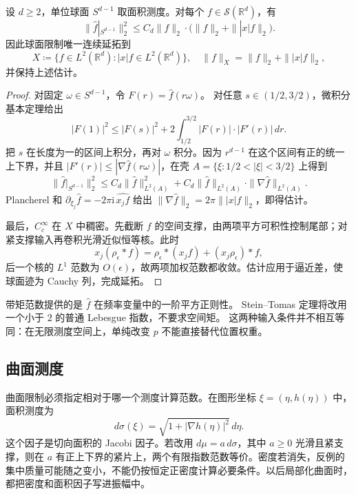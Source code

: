 \begin{proposition}[带空间矩的平方迹]\label{b2:prop:23-moment-trace}
设 \(d\geq2\)，单位球面 \(S^{d-1}\) 取面积测度。对每个
\(f\in\mathcal S(\mathbb R^d)\)，有
\[
 \|\widehat f|_{S^{d-1}}\|_2^2
 \leq C_d\|f\|_2\cdot
       \bigl(\|f\|_2+\||x|f\|_2\bigr).
\]
因此球面限制唯一连续延拓到
\[
 X\coloneqq\{f\in L^2(\mathbb R^d):|x|f\in L^2(\mathbb R^d)\},
 \quad \|f\|_X=\|f\|_2+\||x|f\|_2,
\]
并保持上述估计。
\end{proposition}
\begin{proof}
对固定 \(\omega\in S^{d-1}\)，令 \(F(r)=\widehat f(r\omega)\)。
对任意 \(s\in(1/2,3/2)\)，微积分基本定理给出
\[
 |F(1)|^2\leq |F(s)|^2+
      2\int_{1/2}^{3/2}|F(r)|\cdot|F'(r)|\,dr.
\]
把 \(s\) 在长度为一的区间上积分，再对 \(\omega\) 积分。因为
\(r^{d-1}\) 在这个区间有正的统一上下界，并且
\(|F'(r)|\leq|\nabla\widehat f(r\omega)|\)，在壳
\(A=\{\xi:1/2<|\xi|<3/2\}\) 上得到
\[
 \|\widehat f|_{S^{d-1}}\|_2^2
 \leq C_d\|\widehat f\|_{L^2(A)}^2
       +C_d\|\widehat f\|_{L^2(A)}
                \cdot\|\nabla\widehat f\|_{L^2(A)}.
\]
Plancherel 和
\(\partial_{\xi_j}\widehat f=-2\pi\mathrm i\,\widehat{x_jf}\)
给出
\(\|\nabla\widehat f\|_2=2\pi\||x|f\|_2\)，即得估计。

最后，\(C_c^\infty\) 在 \(X\) 中稠密。先截断 \(f\) 的空间支撑，由两项平方可积性控制尾部；对紧支撑输入再卷积光滑近似恒等核。此时
\[
 x_j(\rho_\epsilon*f)
 =\rho_\epsilon*(x_jf)+(x_j\rho_\epsilon)*f,
\]
后一个核的 \(L^1\) 范数为 \(O(\epsilon)\)，故两项加权范数都收敛。估计应用于逼近差，使球面迹为 Cauchy 列，完成延拓。
\end{proof}

带矩范数提供的是 \(\widehat f\) 在频率变量中的一阶平方正则性。
Stein–Tomas 定理将改用一个小于 \(2\) 的普通 Lebesgue 指数，不要求空间矩。
这两种输入条件并不相互等同：在无限测度空间上，单纯改变 \(p\) 不能直接替代位置权重。

\subsection{曲面测度}
\label{b2:subsec:230102}

曲面限制必须指定相对于哪一个测度计算范数。在图形坐标
\(\xi=(\eta,h(\eta))\) 中，面积测度为
\[
 d\sigma(\xi)=\sqrt{1+|\nabla h(\eta)|^2}\,d\eta.
\]
这个因子是切向面积的 Jacobi 因子。若改用
\(d\mu=a\,d\sigma\)，其中 \(a\geq0\) 光滑且紧支撑，则在 \(a\) 有正上下界的紧片上，两个有限指数范数等价。密度若消失，反例的集中质量可能随之变小，不能仍按恒定正密度计算必要条件。以后局部化曲面时，都把密度和面积因子写进振幅中。

